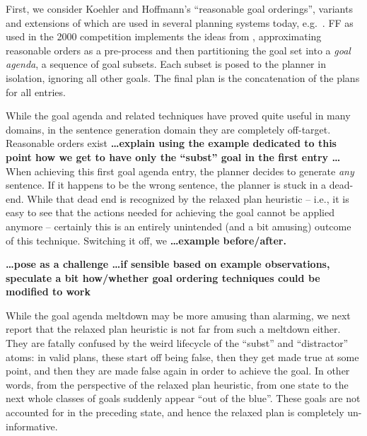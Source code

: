 First, we consider Koehler and Hoffmann's
 ``reasonable goal orderings'',
variants and extensions of which are used in several planning systems
today, e.g.\ \cite{hoffmann:etal:jair-04,richter:etal:aaai-08}. FF as
used in the 2000 competition implements the ideas from
\cite{koehler:hoffmann:jair-00}, approximating reasonable orders as a
pre-process and then partitioning the goal set into a {\em goal
  agenda}, a sequence of goal subsets. Each subset is posed to the
planner in isolation, ignoring all other goals. The final plan is the
concatenation of the plans for all entries.

While the goal agenda and related techniques have proved quite useful
in many domains, in the sentence generation domain they are completely
off-target. Reasonable orders exist {\bf \dots explain using the
  example dedicated to this point how we get to have only the
  ``subst'' goal in the first entry \dots} When achieving this first
goal agenda entry, the planner decides to generate {\em any}
sentence. If it happens to be the wrong sentence, the planner is stuck
in a dead-end. While that dead end is recognized by the relaxed plan
heuristic -- i.e., it is easy to see that the actions needed for
achieving the goal cannot be applied anymore -- certainly this is an
entirely unintended (and a bit amusing) outcome of this
technique. Switching it off, we {\bf \dots example before/after.}

{\bf \dots pose as a challenge \dots if sensible based on example
  observations, speculate a bit how/whether goal ordering techniques
  could be modified to work}











While the goal agenda meltdown may be more amusing than alarming, we
next report that the relaxed plan heuristic is not far from such a
meltdown either. They are fatally confused by the weird lifecycle of
the ``subst'' and ``distractor'' atoms: in valid plans, these start
off being false, then they get made true at some point, and then they
are made false again in order to achieve the goal. In other words,
from the perspective of the relaxed plan heuristic, from one state to
the next whole classes of goals suddenly appear ``out of the
blue''. These goals are not accounted for in the preceding state, and
hence the relaxed plan is completely un-informative.


